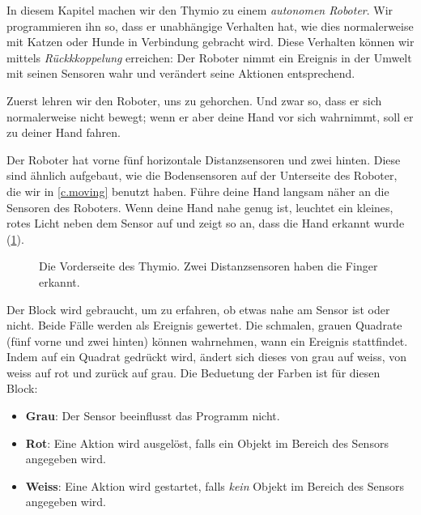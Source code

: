 \label{ch.pet}

In diesem Kapitel machen wir den Thymio zu einem \emph{autonomen Roboter}.
Wir programmieren ihn so, dass er unabhängige Verhalten hat, wie dies normalerweise mit
Katzen oder Hunde in Verbindung gebracht wird. Diese Verhalten können wir mittels \textit{Rückkkoppelung}
erreichen: Der Roboter nimmt ein Ereignis in der Umwelt mit seinen Sensoren
wahr und verändert seine Aktionen entsprechend.


Zuerst lehren wir den Roboter, uns zu gehorchen. 
Und zwar so, dass er sich normalerweise nicht bewegt; 
wenn er aber deine Hand vor sich wahrnimmt, soll er
zu deiner Hand fahren.

Der Roboter hat vorne fünf horizontale Distanzsensoren und zwei hinten.
Diese sind ähnlich aufgebaut, wie die Bodensensoren auf der Unterseite des Roboter, die wir in \cref{c.moving} benutzt haben. Führe deine Hand langsam näher an
die Sensoren des Roboters. Wenn deine Hand nahe genug ist, leuchtet ein kleines, rotes
Licht neben dem Sensor auf und zeigt so an, dass die Hand erkannt wurde (\cref{fig.detect}).


\begin{figure}
\begin{center}
\caption{Die Vorderseite des Thymio. Zwei Distanzsensoren haben die Finger
erkannt.}
\label{fig.detect}
\end{center}
\end{figure}

Der Block  wird gebraucht, 
um zu erfahren, ob etwas nahe am Sensor ist oder nicht. 
Beide Fälle werden als Ereignis gewertet. 
Die schmalen, grauen Quadrate (fünf vorne und zwei hinten) können wahrnehmen,
 wann ein Ereignis stattfindet. 
Indem auf ein Quadrat gedrückt wird, 
ändert sich dieses von grau auf weiss, 
von weiss auf rot und zurück auf grau.
Die Beduetung der Farben ist für diesen Block:

\begin{itemize}
\item \textbf{Grau}: Der Sensor beeinflusst das Programm nicht.
\item \textbf{Rot}: Eine Aktion wird ausgelöst, falls ein Objekt im Bereich des Sensors angegeben wird.
\item \textbf{Weiss}: Eine Aktion wird gestartet, falls \emph{kein} Objekt im Bereich des Sensors angegeben wird.
\end{itemize}

